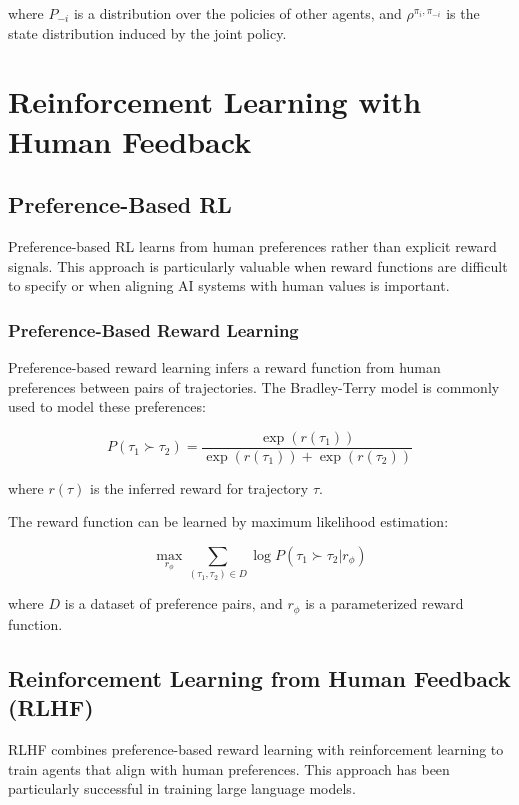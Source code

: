 \documentclass{article}
\begin{document}
where $P_{-i}$ is a distribution over the policies of other agents, and $\rho^{\pi_i, \pi_{-i}}$ is the state distribution induced by the joint policy.

\section{Reinforcement Learning with Human Feedback}

\subsection{Preference-Based RL}

Preference-based RL learns from human preferences rather than explicit reward signals. This approach is particularly valuable when reward functions are difficult to specify or when aligning AI systems with human values is important.

\subsubsection{Preference-Based Reward Learning}

Preference-based reward learning infers a reward function from human preferences between pairs of trajectories. The Bradley-Terry model is commonly used to model these preferences:

\begin{equation}
P(\tau_1 \succ \tau_2) = \frac{\exp(r(\tau_1))}{\exp(r(\tau_1)) + \exp(r(\tau_2))}
\end{equation}

where $r(\tau)$ is the inferred reward for trajectory $\tau$.

The reward function can be learned by maximum likelihood estimation:

\begin{equation}
\max_{r_\phi} \sum_{(\tau_1, \tau_2) \in D} \log P(\tau_1 \succ \tau_2 | r_\phi)
\end{equation}

where $D$ is a dataset of preference pairs, and $r_\phi$ is a parameterized reward function.

\subsection{Reinforcement Learning from Human Feedback (RLHF)}

RLHF combines preference-based reward learning with reinforcement learning to train agents that align with human preferences. This approach has been particularly successful in training large language models.
\end{document}
